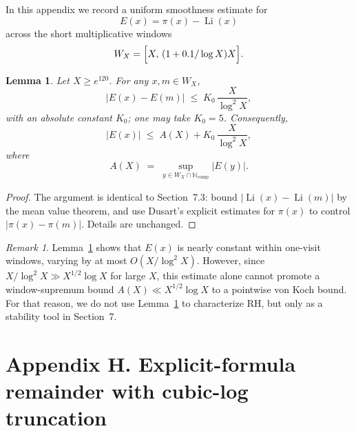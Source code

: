 \documentclass[11pt]{article}
\theoremstyle{plain}
\newtheorem{lemma}[theorem]{Lemma}
\theoremstyle{definition}
\theoremstyle{remark}
\newtheorem*{remark}{Remark}
\begin{document}
\makeatletter
{}%
\def\thesection{G}%
\makeatother


\setcounter{theorem}{0}
\renewcommand{\thetheorem}{G.\arabic{theorem}}



In this appendix we record a uniform smoothness estimate for 
\[
E(x)=\pi(x)-\operatorname{Li}(x)
\]
across the short multiplicative windows
\[
W_X=\Bigl[X,\,(1+0.1/\log X)X\Bigr].
\]

\begin{lemma}\label{lem:G1}
Let $X\ge e^{120}$. For any $x,m\in W_X$,
\[
|E(x)-E(m)| \;\le\; K_0\,\frac{X}{\log^2X},
\]
with an absolute constant $K_0$; one may take $K_0=5$. Consequently,
\[
|E(x)| \;\le\; A(X) + K_0\,\frac{X}{\log^2X},
\]
where
\[
A(X) \;=\; \sup_{y\in W_X\cap\mathbb{N}_{\mathrm{comp}}}|E(y)|.
\]
\end{lemma}

\begin{proof}
The argument is identical to Section~7.3: bound $|\operatorname{Li}(x)-\operatorname{Li}(m)|$ by the mean value theorem, and use Dusart’s explicit estimates for $\pi(x)$ to control $|\pi(x)-\pi(m)|$. Details are unchanged.
\end{proof}

\begin{remark}
Lemma~\ref{lem:G1} shows that $E(x)$ is nearly constant within one-visit windows, varying by at most $O(X/\log^2X)$. However, since $X/\log^2X \gg X^{1/2}\log X$ for large $X$, this estimate alone cannot promote a window-supremum bound $A(X)\ll X^{1/2}\log X$ to a pointwise von Koch bound. For that reason, we do not use Lemma~\ref{lem:G1} to characterize RH, but only as a stability tool in Section~7.
\end{remark}

\section*{Appendix H. Explicit-formula remainder with cubic-log truncation}\label{app:remainder}
\end{document}
